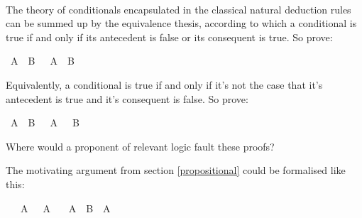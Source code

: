 \begin{isabellebody}
\isadelimproof
\ %
\endisadelimproof
%
\isatagproof
{}\isamarkupfalse%
%
\endisatagproof
{\isafoldproof}%
%
\isadelimproof
%
\endisadelimproof
%
\begin{isamarkuptext}%
\begin{Exercise}[title = The Equivalence Thesis]
The theory of conditionals encapsulated in the classical natural deduction rules can be
summed up by the equivalence thesis, according to which a conditional is true if and only if
its antecedent is false or its consequent is true. So prove:  \end{Exercise}%
\end{isamarkuptext}\isamarkuptrue%
\isamarkupfalse%
\ {\isachardoublequoteopen}{\isacharparenleft}A\ {\isasymlongrightarrow}\ B{\isacharparenright}\ {\isasymlongleftrightarrow}\ {\isacharparenleft}{\isasymnot}\ A\ {\isasymor}\ B{\isacharparenright}{\isachardoublequoteclose}%
\isadelimproof
\ %
\endisadelimproof
%
\isatagproof
{}\isamarkupfalse%
%
\endisatagproof
{\isafoldproof}%
%
\isadelimproof
%
\endisadelimproof
%
\begin{isamarkuptext}%
Equivalently, a conditional is true if and only if it's not the case that it's antecedent is
true and it's consequent is false. So prove:%
\end{isamarkuptext}\isamarkuptrue%
\isamarkupfalse%
\ {\isachardoublequoteopen}{\isacharparenleft}A\ {\isasymlongrightarrow}\ B{\isacharparenright}\ {\isasymlongleftrightarrow}\ {\isasymnot}\ {\isacharparenleft}A\ {\isasymand}\ {\isasymnot}\ B{\isacharparenright}{\isachardoublequoteclose}%
\isadelimproof
\ %
\endisadelimproof
%
\isatagproof
{}\isamarkupfalse%
%
\endisatagproof
{\isafoldproof}%
%
\isadelimproof
%
\endisadelimproof
%
\begin{isamarkuptext}%
Where would a proponent of relevant logic fault these proofs?%
\end{isamarkuptext}\isamarkuptrue%
%
\begin{isamarkuptext}%
\begin{Exercise}[title = The Air Raid] The motivating argument from section \ref{propositional} could be formalised like this: \end{Exercise}%
\end{isamarkuptext}\isamarkuptrue%
\isamarkupfalse%
\isanewline
\ \ \ {\isachardoublequoteopen}A\ {\isasymor}\ {\isasymnot}\ A{\isachardoublequoteclose}\isanewline
\ \ \ {\isachardoublequoteopen}A\ {\isasymlongrightarrow}\ B\ {\isasymlongrightarrow}\ A{\isachardoublequoteclose}\isanewline

\end{isabellebody}
